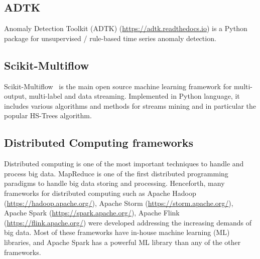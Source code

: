 
\subsection{ADTK}
Anomaly Detection Toolkit (ADTK) (\href{https://adtk.readthedocs.io}{https://adtk.readthedocs.io})
is a Python package for unsupervised / rule-based time series anomaly detection.

\subsection{Scikit-Multiflow}
Scikit-Multiflow~\cite{montiel2018scikit}
is the main open source machine learning framework
for multi-output, 
multi-label and data streaming. 
Implemented in Python language, 
it includes various algorithms and 
methods for streams mining and in
particular the popular HS-Trees algorithm.

\subsection{Distributed Computing frameworks}
Distributed computing is one of the most 
important techniques to handle
and process big data.
MapReduce is one
of the first distributed programming paradigms to 
handle big data storing and processing.
Henceforth, 
many frameworks for distributed computing 
such as Apache Hadoop
(\href{https://hadoop.apache.org/}{https://hadoop.apache.org/}), 
Apache Storm 
(\href{https://storm.apache.org/}{https://storm.apache.org/}), 
Apache Spark 
(\href{https://spark.apache.org/}{https://spark.apache.org/}), 
Apache Flink 
(\href{https://flink.apache.org/}{https://flink.apache.org/})
were developed addressing the increasing demands of big data. 
Most of these frameworks
have in-house machine learning (ML) libraries, 
and Apache Spark has a powerful
ML library than any of the other frameworks.



